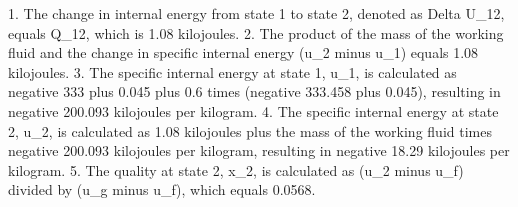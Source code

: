1. The change in internal energy from state 1 to state 2, denoted as Delta U_12, equals Q_12, which is 1.08 kilojoules.
2. The product of the mass of the working fluid and the change in specific internal energy (u_2 minus u_1) equals 1.08 kilojoules.
3. The specific internal energy at state 1, u_1, is calculated as negative 333 plus 0.045 plus 0.6 times (negative 333.458 plus 0.045), resulting in negative 200.093 kilojoules per kilogram.
4. The specific internal energy at state 2, u_2, is calculated as 1.08 kilojoules plus the mass of the working fluid times negative 200.093 kilojoules per kilogram, resulting in negative 18.29 kilojoules per kilogram.
5. The quality at state 2, x_2, is calculated as (u_2 minus u_f) divided by (u_g minus u_f), which equals 0.0568.